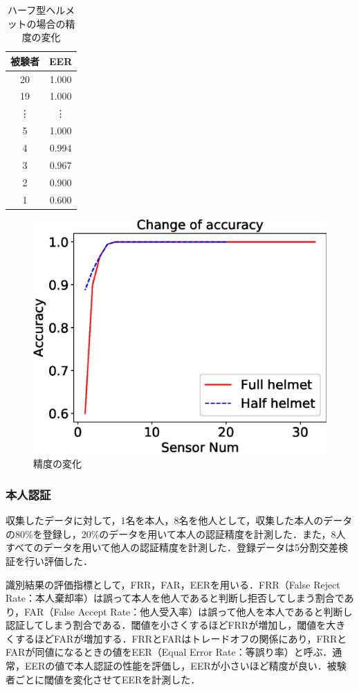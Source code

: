 \documentclass[Japanese,noauthor]{dicomopapers}
\begin{document}
\begin{table}[!t]
  \centering
  \caption{ハーフ型ヘルメットの場合の精度の変化}
  \begin{tabular}{c|c} \hline\hline
    被験者 & EER \\ \hline
    20 & 1.000 \\
    19 & 1.000 \\
    \vdots & \vdots \\
    5 & 1.000 \\
    4 & 0.994 \\
    3 & 0.967 \\
    2 & 0.900 \\
    1 & 0.600 \\ \hline
  \end{tabular}
  \label{half_num}
\end{table}

\begin{figure}[!t]
  \centering
    \includegraphics[width=0.70\linewidth]{figure/Acc.eps}
  \caption{精度の変化}
  \label{Acc}
\end{figure}

\subsubsection{本人認証}
収集したデータに対して，1名を本人，8名を他人として，収集した本人のデータの80\%を登録し，20\%のデータを用いて本人の認証精度を計測した．また，8人すべてのデータを用いて他人の認証精度を計測した．登録データは5分割交差検証を行い評価した．\par

識別結果の評価指標として，FRR，FAR，EERを用いる．FRR（False Reject Rate：本人棄却率）は誤って本人を他人であると判断し拒否してしまう割合であり，FAR（False Accept Rate：他人受入率）は誤って他人を本人であると判断し認証してしまう割合である．閾値を小さくするほどFRRが増加し，閾値を大きくするほどFARが増加する．FRRとFARはトレードオフの関係にあり，FRRとFARが同値になるときの値をEER（Equal Error Rate：等誤り率）と呼ぶ．通常，EERの値で本人認証の性能を評価し，EERが小さいほど精度が良い．被験者ごとに閾値を変化させてEERを計測した．\par
\end{document}
